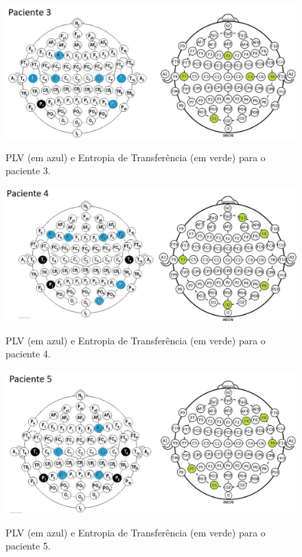 \documentclass[
	12pt,				%
	openright,			%
	twoside,			%
	a4paper,			%
	english,			%
	french,				%
	spanish,			%
	brazil				%
	]{abntex2}
\begin{document}
\begin{figure}[]
\centering
\includegraphics[width=17cm]{figs/p3.JPG}
\label{eeg}
\caption{PLV (em azul) e Entropia de Transferência (em verde) para o paciente 3.}
\end{figure}

\begin{figure}[]
\centering
\includegraphics[width=17cm]{figs/p4.JPG}
\label{eeg}
\caption{PLV (em azul) e Entropia de Transferência (em verde) para o paciente 4.}
\end{figure}

\begin{figure}[]
\centering
\includegraphics[width=17cm]{figs/p5.JPG}
\label{eeg}
\caption{PLV (em azul) e Entropia de Transferência (em verde) para o paciente 5.}
\end{figure}
\end{document}
